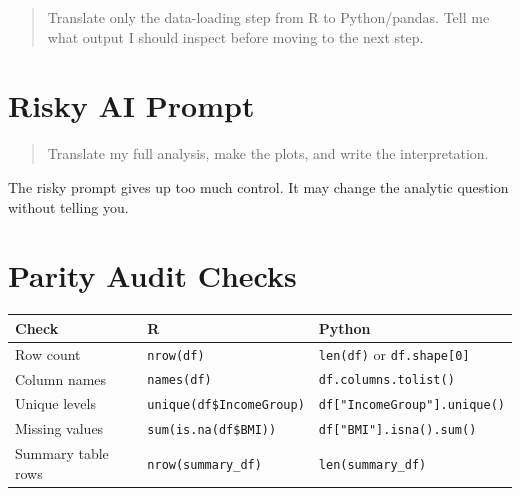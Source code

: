 \documentclass[
  letterpaper,
  DIV=11,
  numbers=noendperiod,
  oneside]{scrreprt}
\begin{document}
\begin{quote}
Translate only the data-loading step from R to Python/pandas. Tell me
what output I should inspect before moving to the next step.
\end{quote}

\section{Risky AI Prompt}\label{risky-ai-prompt}

\begin{quote}
Translate my full analysis, make the plots, and write the
interpretation.
\end{quote}

The risky prompt gives up too much control. It may change the analytic
question without telling you.

\section{Parity Audit Checks}\label{parity-audit-checks}

\begin{longtable}[]{@{}
  >{\raggedright\arraybackslash}p{}
  >{\raggedright\arraybackslash}p{}
  >{\raggedright\arraybackslash}p{}@{}}
\toprule\noalign{}
\begin{minipage}[b]{\linewidth}\raggedright
Check
\end{minipage} & \begin{minipage}[b]{\linewidth}\raggedright
R
\end{minipage} & \begin{minipage}[b]{\linewidth}\raggedright
Python
\end{minipage} \\
\midrule\noalign{}
\endhead
\bottomrule\noalign{}
\endlastfoot
Row count & \texttt{nrow(df)} & \texttt{len(df)} or
\texttt{df.shape{[}0{]}} \\
Column names & \texttt{names(df)} & \texttt{df.columns.tolist()} \\
Unique levels & \texttt{unique(df\$IncomeGroup)} &
\texttt{df{[}"IncomeGroup"{]}.unique()} \\
Missing values & \texttt{sum(is.na(df\$BMI))} &
\texttt{df{[}"BMI"{]}.isna().sum()} \\
Summary table rows & \texttt{nrow(summary\_df)} &
\texttt{len(summary\_df)} \\
\end{longtable}
\end{document}
